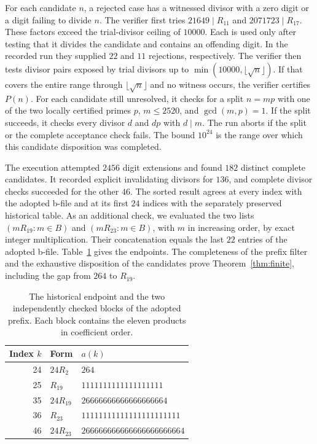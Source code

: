 \documentclass[11pt]{article}
\begin{document}
For each candidate \(n\), a rejected case has a witnessed divisor
with a zero digit or a digit failing to divide \(n\). The verifier
first tries \(21649\mid R_{11}\) and \(2071723\mid R_{17}\).
These factors exceed the trial-divisor ceiling of \(10000\).
Each is used only after testing that it divides the candidate and
contains an offending digit. In the recorded run they supplied
\(22\) and \(11\) rejections, respectively. The verifier then
tests divisor pairs exposed by trial divisors up to
\(\min(10000,\lfloor\sqrt n\rfloor)\). If that covers the entire
range through \(\lfloor\sqrt n\rfloor\) and no witness occurs,
the verifier certifies \(P(n)\). For each candidate still unresolved,
it checks for a split \(n=mp\) with one of the two locally certified
primes \(p\), \(m\le2520\), and \(\gcd(m,p)=1\). If the split succeeds,
it checks every divisor \(d\) and \(dp\) with \(d\mid m\).
The run aborts if the split or the complete acceptance check fails.
The bound \(10^{24}\) is the range over which this candidate
disposition was completed.

The execution attempted \(2456\) digit extensions and found \(182\)
distinct complete candidates. It recorded explicit invalidating
divisors for \(136\), and complete divisor checks succeeded for the
other \(46\). The sorted result agrees at every index with the
adopted b-file and at its first \(24\) indices with the separately
preserved historical table. As an additional check, we evaluated the two
lists \((mR_{19}:m\in B)\) and \((mR_{23}:m\in B)\), with \(m\) in
increasing order, by exact integer multiplication. Their concatenation
equals the last \(22\) entries of the adopted b-file.
Table~\ref{tab:ends} gives the endpoints. The completeness of the prefix
filter and the exhaustive disposition of the candidates
prove Theorem~\ref{thm:finite}, including the gap from \(264\) to
\(R_{19}\).

\begin{table}[htbp]
\centering
\begin{tabular}{@{}rll@{}}
\toprule
Index \(k\)&Form & \(a(k)\)\\
\midrule
24 & \(24R_2\) & \(264\)\\
25 & \(R_{19}\) & \(1111111111111111111\)\\
35 & \(24R_{19}\) & \(26666666666666666664\)\\
36 & \(R_{23}\) & \(11111111111111111111111\)\\
46 & \(24R_{23}\) & \(266666666666666666666664\)\\
\bottomrule
\end{tabular}
\caption{The historical endpoint and the two independently checked
blocks of the adopted prefix. Each block contains the eleven products
in coefficient order.}
\label{tab:ends}
\end{table}
\end{document}
